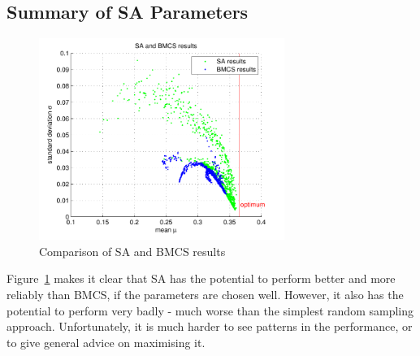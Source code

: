 \documentclass[10pt]{article}
\begin{document}
\subsection{Summary of SA Parameters}

\begin{figure}
  \begin{center}
    \includegraphics[width=8cm]{sa_and_bmcs.pdf}
    \end{center}
    \caption{Comparison of SA and BMCS results}
    \label{fig:sa_and_bmcs}
    \end{figure}

Figure~\ref{fig:sa_and_bmcs} makes it clear that SA has the potential to
perform better and more reliably than BMCS, if the parameters are chosen well.
However, it also has the potential to perform very badly - much worse than the
simplest random sampling approach. Unfortunately, it is much harder to see
patterns in the performance, or to give general advice on maximising it.
\end{document}
